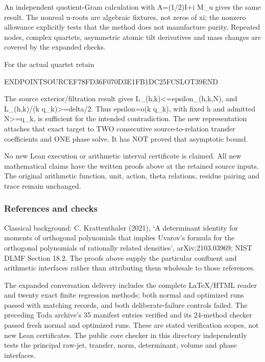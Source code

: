 An independent quotient-Gram calculation with A=(1/2)I+i M\_u gives the same result. The nonreal u-roots are algebraic fixtures, not zeros of xi; the nonzero allowance explicitly tests that the method does not manufacture purity. Repeated nodes, complex quartets, asymmetric atomic tilt derivatives and mass changes are covered by the expanded checks.

For the actual quartet retain

ENDPOINTSOURCEF78FD36F070D3E1FB1DC25FCSLOT39END

The source exterior/filtration result gives L\_(h,k)\textless=epsilon\_(h,k,N), and L\_(h,k)/(k q\_k)\textgreater=delta/2. Thus epsilon=o(k q\_k), with fixed h and admitted N\textgreater=q\_k, is sufficient for the intended contradiction. The new representation attaches that exact target to TWO consecutive source-to-relation transfer coefficients and ONE phase solve. It has NOT proved that asymptotic bound.

No new Lean execution or arithmetic interval certificate is claimed. All new mathematical claims have the written proofs above at the retained source inputs. The original arithmetic function, unit, action, theta relations, residue pairing and trace remain unchanged.

\subsubsection{References and checks}\label{endpoint-pr24_current_corrected--references-and-checks}

Classical background: C. Krattenthaler (2021), `A determinant identity for moments of orthogonal polynomials that implies Uvarov's formula for the orthogonal polynomials of rationally related densities', arXiv:2103.03969; NIST DLMF Section 18.2. The proofs above supply the particular confluent and arithmetic interfaces rather than attributing them wholesale to those references.

The expanded conversation delivery includes the complete LaTeX/HTML reader and twenty exact finite regression methods; both normal and optimized runs passed with matching records, and both deliberate-failure controls failed. The preceding Toda archive's 35 manifest entries verified and its 24-method checker passed fresh normal and optimized runs. These are stated verification scopes, not new Lean certificates. The public core checker in this directory independently tests the principal raw-jet, transfer, norm, determinant, volume and phase interfaces.

